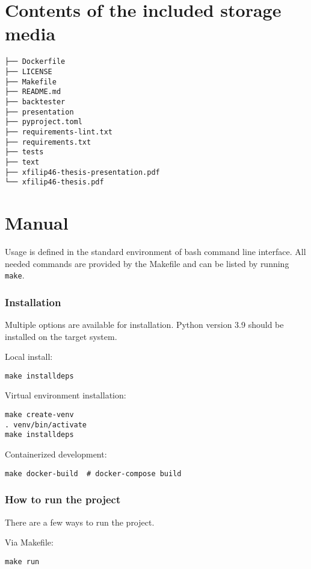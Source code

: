 


\chapter{Contents of the included storage media}
\begin{verbatim}
├── Dockerfile
├── LICENSE
├── Makefile
├── README.md
├── backtester
├── presentation
├── pyproject.toml
├── requirements-lint.txt
├── requirements.txt
├── tests
├── text
├── xfilip46-thesis-presentation.pdf
└── xfilip46-thesis.pdf
\end{verbatim}


\chapter{Manual}
Usage is defined in the standard environment of bash command line interface. All needed commands are provided by the Makefile and can be listed by running \texttt{make}.

\subsection*{Installation}
Multiple options are available for installation. Python version 3.9 should be installed on the target system.

Local install:
\begin{verbatim}
make installdeps
\end{verbatim}

Virtual environment installation:
\begin{verbatim}
make create-venv
. venv/bin/activate
make installdeps
\end{verbatim}

Containerized development:
\begin{verbatim}
make docker-build  # docker-compose build
\end{verbatim}

\subsection*{How to run the project}
There are a few ways to run the project.

Via Makefile:
\begin{verbatim}
make run
\end{verbatim}


